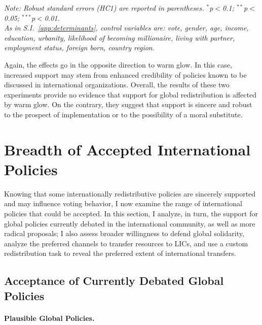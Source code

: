 \documentclass[12pt,english]{article}
\begin{document}
\begin{bibunit}
\begin{table}[!htbp]
  \caption[Effect on support for global redistribution of believing that it is likely]{Effect on support for global redistribution of believing that it is likely.}\label{tab:iv}
  \makebox[\textwidth][c]{}
  \textit{Note: Robust standard errors (HC1) are reported in parentheses. \hfill
  $^{*}$p$<$0.1; $^{**}$p$<$0.05; $^{***}$p$<$0.01. \\
  As in S.I.~\ref{app:determinants}, control variables are: vote, gender, age, income, education, urbanity, likelihood of becoming millionaire, living with partner, employment status, foreign born, country region.}
\end{table}

Again, the effects go in the opposite direction to warm glow. In this case, increased support may stem from enhanced credibility of policies known to be discussed in international organizations.
Overall, the results of these two experiments provide no evidence that support for global redistribution is affected by warm glow. On the contrary, they suggest that support is sincere and robust to the prospect of implementation or to the possibility of a moral substitute.


\section{Breadth of Accepted International Policies\label{sec:breadth}}

Knowing that some internationally redistributive policies are sincerely supported and may influence voting behavior, I now examine the range of international policies that could be accepted. In this section, I analyze, in turn, the support for global policies currently debated in the international community, as well as more radical proposals; I also assess broader willingness to defend global solidarity, analyze the preferred channels to transfer resources to LICs, and use a custom redistribution task to reveal the preferred extent of international transfers.

\subsection{Acceptance of Currently Debated Global Policies}\label{subsec:debated}

\paragraph{Plausible Global Policies.}


\end{bibunit}
\end{document}
